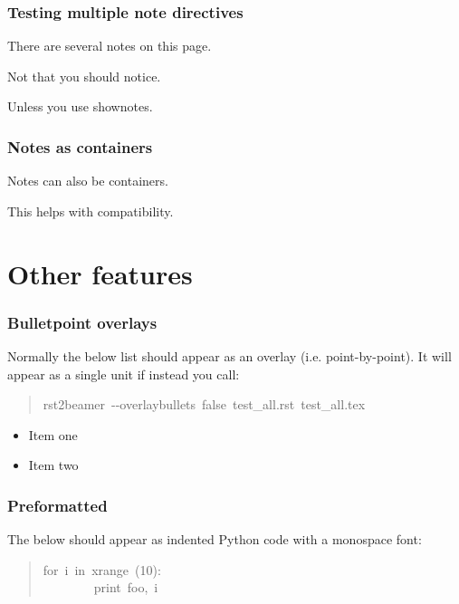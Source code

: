 \documentclass[t]{beamer}
\begin{document}
\begin{frame}[fragile]
\frametitle{Testing multiple note directives}


There are several notes on this page.

Not that you should notice.

Unless you use \textquotedbl{}shownotes\textquotedbl{}.

\end{frame}

\begin{frame}[fragile]
\frametitle{Notes as containers}


Notes can also be containers.

This helps with compatibility.

\end{frame}


\section{Other features%
  \label{other-features}%
}

\begin{frame}[fragile]
\frametitle{Bulletpoint overlays}


Normally the below list should appear as an overlay (i.e. point-by-point). It
will appear as a single unit if instead you call:
%
\begin{quote}{\ttfamily \raggedright \noindent
rst2beamer~-{}-overlaybullets~false~test\_all.rst~test\_all.tex
}
\end{quote}
\begin{itemize}[<+-| alert@+>]

\item Item one

\item Item two
\end{itemize}

\end{frame}

\begin{frame}[fragile]
\frametitle{Preformatted}


The below should appear as indented Python code with a monospace font:
%
\begin{quote}{\ttfamily \raggedright \noindent
for~i~in~xrange~(10):\\
~~~~~~~~print~\textquotedbl{}foo\textquotedbl{},~i
}
\end{quote}

\end{frame}
\end{document}
